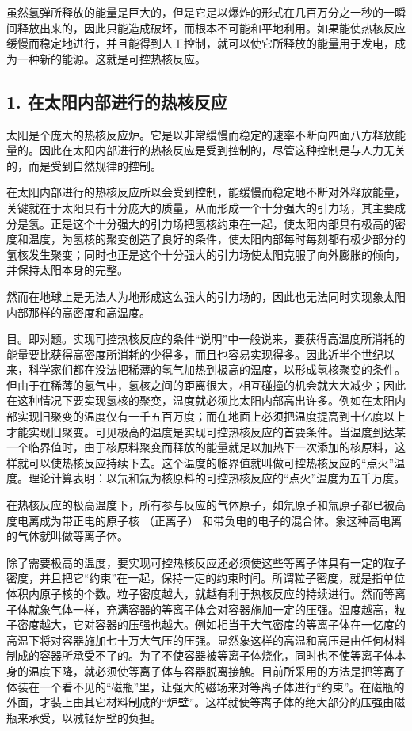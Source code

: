 虽然氢弹所释放的能量是巨大的，但是它是以爆炸的形式在几百万分之一秒的一瞬间释放出来的，因此只能造成破坏，而根本不可能和平地利用。如果能使热核反应缓慢而稳定地进行，并且能得到人工控制，就可以使它所释放的能量用于发电，成为一种新的能源。这就是可控热核反应。

\subsection{1.
在太阳内部进行的热核反应}

太阳是个庞大的热核反应炉。它是以非常缓慢而稳定的速率不断向四面八方释放能量的。因此在太阳内部进行的热核反应是受到控制的，尽管这种控制是与人力无关的，而是受到自然规律的控制。

在太阳内部进行的热核反应所以会受到控制，能缓慢而稳定地不断对外释放能量，关键就在于太阳具有十分庞大的质量，从而形成一个十分强大的引力场，其主要成分是氢。正是这个十分强大的引力场把氢核约束在一起，使太阳内部具有极高的密度和温度，为氢核的聚变创造了良好的条件，使太阳内部每时每刻都有极少部分的氢核发生聚变；同时也正是这个十分强大的引力场使太阳克服了向外膨胀的倾向，并保持太阳本身的完整。

然而在地球上是无法人为地形成这么强大的引力场的，因此也无法同时实现象太阳内部那样的高密度和高温度。

目。即对题。实现可控热核反应的条件``说明''中一般说来，要获得高温度所消耗的能量要比获得高密度所消耗的少得多，而且也容易实现得多。因此近半个世纪以来，科学家们都在没法把稀薄的氢气加热到极高的温度，以形成氢核聚变的条件。但由于在稀薄的氢气中，氢核之间的距离很大，相互碰撞的机会就大大减少；因此在这种情况下要实现氢核的聚变，温度就必须比太阳内部高出许多。例如在太阳内部实现旧聚变的温度仅有一千五百万度；而在地面上必须把温度提高到十亿度以上才能实现旧聚变。可见极高的温度是实现可控热核反应的首要条件。当温度到达某一个临界值时，由于核原料聚变而释放的能量就足以加热下一次添加的核原料，这样就可以使热核反应持续下去。这个温度的临界值就叫做可控热核反应的``点火''温度。理论计算表明：以氘和氚为核原料的可控热核反应的``点火''温度为五千万度。

在热核反应的极高温度下，所有参与反应的气体原子，如氘原子和氚原子都已被高度电离成为带正电的原子核
（正离子） 和带负电的电子的混合体。象这种高电离的气体就叫做等离子体。

除了需要极高的温度，要实现可控热核反应还必须使这些等离子体具有一定的粒子密度，并且把它``约束''在一起，保持一定的约束时间。所谓粒子密度，就是指单位体积内原子核的个数。粒子密度越大，就越有利于热核反应的持续进行。然而等离子体就象气体一样，充满容器的等离子体会对容器施加一定的压强。温度越高，粒子密度越大，它对容器的压强也越大。例如相当于大气密度的等离子体在一亿度的高温下将对容器施加七十万大气压的压强。显然象这样的高温和高压是由任何材料制成的容器所承受不了的。为了不使容器被等离子体烧化，同时也不使等离子体本身的温度下降，就必须使等离子体与容器脱离接触。目前所采用的方法是把等离子体装在一个看不见的``磁瓶''里，让强大的磁场来对等离子体进行``约束''。在磁瓶的外面，才装上由其它材料制成的``炉壁''。这样就使等离子体的绝大部分的压强由磁瓶来承受，以减轻炉壁的负担。

